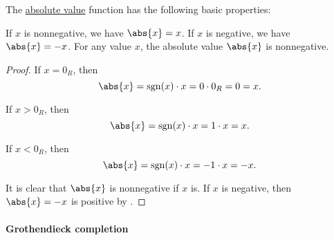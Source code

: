 \begin{proposition}\label{thm:def:totally_ordered_ring_absolute_value}
  The \hyperref[def:totally_ordered_ring_absolute_value]{absolute value} function has the following basic properties:
  \begin{thmenum}
     If \( x \) is nonnegative, we have \( \abs{x} = x \).
     If \( x \) is negative, we have \( \abs{x} = -x \).
     For any value \( x \), the absolute value \( \abs{x} \) is nonnegative.
  \end{thmenum}
\end{proposition}
\begin{proof}
   If \( x = 0_R \), then
  \begin{equation*}
    \abs{x} = \sgn(x) \cdot x = 0 \cdot 0_R = 0 = x.
  \end{equation*}

  If \( x > 0_R \), then
  \begin{equation*}
    \abs{x} = \sgn(x) \cdot x = 1 \cdot x = x.
  \end{equation*}

   If \( x < 0_R \), then
  \begin{equation*}
    \abs{x} = \sgn(x) \cdot x = -1 \cdot x = -x.
  \end{equation*}

   It is clear that \( \abs{x} \) is nonnegative if \( x \) is. If \( x \) is negative, then \( \abs{x} = -x \) is positive by .
\end{proof}

\paragraph{Grothendieck completion}

